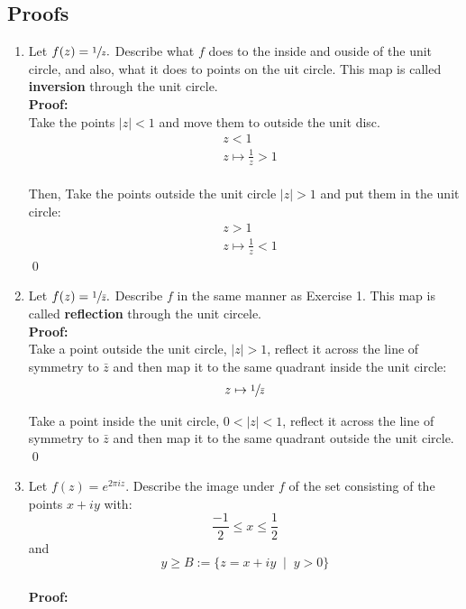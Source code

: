 \subsection{Proofs}
\begin{enumerate}
	\item Let $f(z) = \sfrac{1}{z}.$ Describe what $f$ does to the inside and ouside of the unit circle, and also, what it does to points on the uit circle. This map is called \textbf{inversion} through the unit circle. \\
	
	\textbf{Proof:} \\
	Take the points $|z| < 1$ and move them to outside the unit disc.
	\begin{align*}
		&z < 1 \\
		&z \mapsto \frac{1}{z} > 1
	\end{align*}
	\\
	Then, Take the points outside the unit circle $|z| > 1$ and put them in the unit circle:
	\begin{align*}
		&z > 1 \\
		&z \mapsto \frac{1}{z} < 1
	\end{align*}
	\qed


	\item Let $f(z) = \sfrac{1}{\bar{z}}.$ Describe $f$ in the same manner as Exercise 1. 
	This map is called \textbf{reflection} through the unit circele. \\
	
	\textbf{Proof:} \\
	Take a point outside the unit circle, $|z| > 1$, reflect it across the line of symmetry to $\bar{z}$ and then map it to the same quadrant inside the unit circle:
	\begin{align*}
		z \mapsto \sfrac{1}{\bar{z}} \\
	\end{align*}

	Take a point inside the unit circle, $0 < |z| < 1$, reflect it across the line of symmetry to $\bar{z}$ and then map it to the same quadrant outside the unit circle. 
	\qed


	\item Let $f(z) = e^{2\pi iz}.$ Describe the image under $f$ of the set consisting of the points $x + iy$ with:
	\[ \frac{-1}{2} \leq x \leq \frac{1}{2} \]
	and
	\[ y \geq B := \{ z = x + iy \;\;|\;\; y > 0 \} \] \\

	\textbf{Proof:} \\


\end{enumerate}
